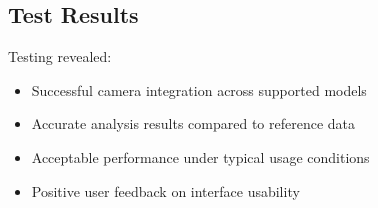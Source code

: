 \subsection{Test Results}
Testing revealed:

\begin{itemize}
    \item Successful camera integration across supported models
    \item Accurate analysis results compared to reference data
    \item Acceptable performance under typical usage conditions
    \item Positive user feedback on interface usability
\end{itemize}
